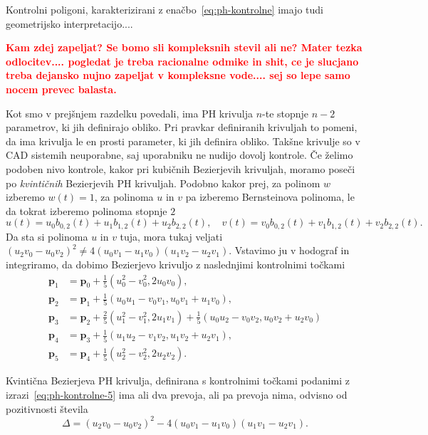 \documentclass[isrm2, tisk]{fmfdelo}
\newcommand{\p}{\textbf{p}}
\newcommand{\mycomment}[1]{\textbf{\textcolor{red}{#1}}}
\begin{document}
    Kontrolni poligoni, karakterizirani z enačbo~\eqref{eq:ph-kontrolne} imajo tudi geometrijsko interpretacijo....

    \mycomment{ Kam zdej zapeljat? Se bomo sli kompleksnih stevil ali ne? Mater tezka odlocitev.... pogledat je treba racionalne odmike in shit, ce je slucjano treba dejansko nujno zapeljat v kompleksne vode.... sej so lepe samo nocem prevec balasta.}

    Kot smo v prejšnjem razdelku povedali, ima PH krivulja $n$-te stopnje $n-2$ parametrov, ki jih definirajo obliko.
    Pri pravkar definiranih krivuljah to pomeni, da ima krivulja le en prosti parameter, ki jih definira obliko.
    Takšne krivulje so v CAD sistemih neuporabne, saj uporabniku ne nudijo dovolj kontrole.
    Če želimo podoben nivo kontrole, kakor pri kubičnih Bezierjevih krivuljah, moramo poseči po \textit{kvintičnih} Bezierjevih PH krivuljah.
    Podobno kakor prej, za polinom $w$ izberemo $w(t)=1$, za polinoma $u$ in $v$ pa izberemo Bernsteinova polinoma, le da tokrat izberemo polinoma stopnje $2$
    \[u(t)=u_0b_{0,2}(t)+u_1b_{1,2}(t)+u_2b_{2,2}(t),\quad v(t)=v_0b_{0,2}(t)+v_1b_{1,2}(t)+v_2b_{2,2}(t).\]
    Da sta si polinoma $u$ in $v$ tuja, mora tukaj veljati $(u_2 v_0 -u_0 v_2)^2 \neq 4(u_0 v_1 - u_1 v_0)(u_1 v_2-u_2v_1)$.
    Vstavimo ju v hodograf in integriramo, da dobimo Bezierjevo krivuljo z naslednjimi kontrolnimi točkami
    \begin{align}
        \p_1 &=\p_0+\frac{1}{5}(u_0^2-v_0^2,2u_0v_0), \nonumber\\
        \p_2 &= \p_1+\frac{1}{5}(u_0u_1-v_0v_1, u_0v_1+u_1v_0),\nonumber\\
        \p_3 &= \p_2 + \frac{2}{5}(u_1^2-v_1^2, 2u_1v_1) + \frac{1}{5}(u_0u_2-v_0v_2, u_0v_2+u_2v_0) \nonumber \\
        \p_4 &= \p_3+\frac{1}{5}(u_1u_2-v_1v_2, u_1v_2+u_2v_1),\nonumber\\
        \p_5 &=\p_4+\frac{1}{5}(u_2^2-v_2^2,2u_2v_2).  \label{eq:ph-kontrolne-5}
    \end{align}

    \begin{lema}
        Kvintična Bezierjeva PH krivulja, definirana s kontrolnimi točkami podanimi z izrazi~\eqref{eq:ph-kontrolne-5} ima ali dva prevoja, ali pa prevoja nima, odvisno od pozitivnosti števila \[\Delta = (u_2v_0-u_0v_2)^2 - 4(u_0v_1-u_1v_0)(u_1v_1-u_2v_1).\]
    \end{lema}
\end{document}
